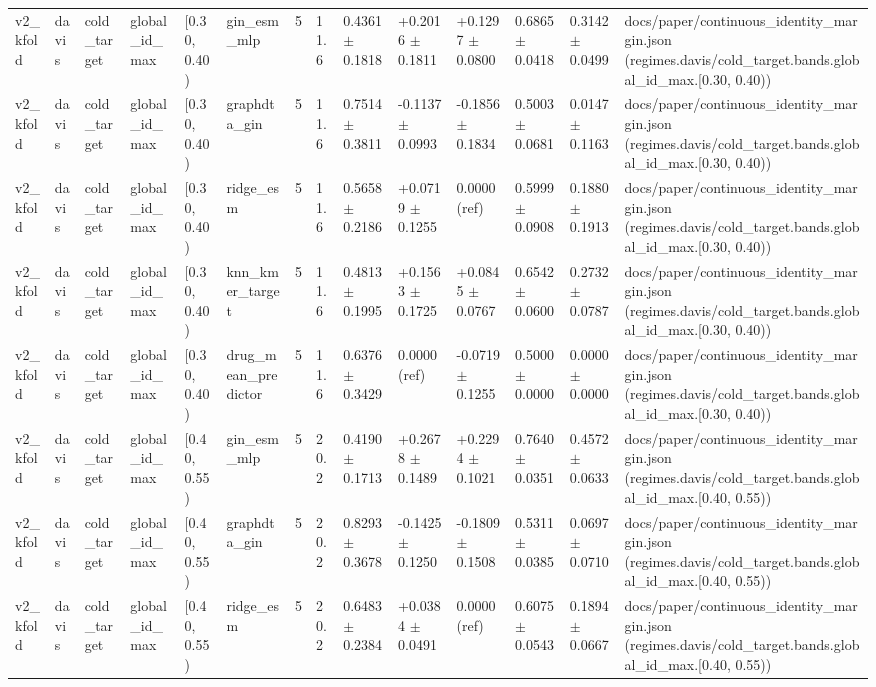\begin{table}[htbp]
\begin{tabular}{llllllllllllll}
v2\_kfold & davis & cold\_target & global\_id\_max & [0.30, 0.40) & gin\_esm\_mlp & 5 & 11.6 & 0.4361 $\pm$ 0.1818 & +0.2016 $\pm$ 0.1811 & +0.1297 $\pm$ 0.0800 & 0.6865 $\pm$ 0.0418 & 0.3142 $\pm$ 0.0499 & docs/paper/continuous\_identity\_margin.json (regimes.davis/cold\_target.bands.global\_id\_max.[0.30, 0.40)) \\
v2\_kfold & davis & cold\_target & global\_id\_max & [0.30, 0.40) & graphdta\_gin & 5 & 11.6 & 0.7514 $\pm$ 0.3811 & -0.1137 $\pm$ 0.0993 & -0.1856 $\pm$ 0.1834 & 0.5003 $\pm$ 0.0681 & 0.0147 $\pm$ 0.1163 & docs/paper/continuous\_identity\_margin.json (regimes.davis/cold\_target.bands.global\_id\_max.[0.30, 0.40)) \\
v2\_kfold & davis & cold\_target & global\_id\_max & [0.30, 0.40) & ridge\_esm & 5 & 11.6 & 0.5658 $\pm$ 0.2186 & +0.0719 $\pm$ 0.1255 & 0.0000 (ref) & 0.5999 $\pm$ 0.0908 & 0.1880 $\pm$ 0.1913 & docs/paper/continuous\_identity\_margin.json (regimes.davis/cold\_target.bands.global\_id\_max.[0.30, 0.40)) \\
v2\_kfold & davis & cold\_target & global\_id\_max & [0.30, 0.40) & knn\_kmer\_target & 5 & 11.6 & 0.4813 $\pm$ 0.1995 & +0.1563 $\pm$ 0.1725 & +0.0845 $\pm$ 0.0767 & 0.6542 $\pm$ 0.0600 & 0.2732 $\pm$ 0.0787 & docs/paper/continuous\_identity\_margin.json (regimes.davis/cold\_target.bands.global\_id\_max.[0.30, 0.40)) \\
v2\_kfold & davis & cold\_target & global\_id\_max & [0.30, 0.40) & drug\_mean\_predictor & 5 & 11.6 & 0.6376 $\pm$ 0.3429 & 0.0000 (ref) & -0.0719 $\pm$ 0.1255 & 0.5000 $\pm$ 0.0000 & 0.0000 $\pm$ 0.0000 & docs/paper/continuous\_identity\_margin.json (regimes.davis/cold\_target.bands.global\_id\_max.[0.30, 0.40)) \\
v2\_kfold & davis & cold\_target & global\_id\_max & [0.40, 0.55) & gin\_esm\_mlp & 5 & 20.2 & 0.4190 $\pm$ 0.1713 & +0.2678 $\pm$ 0.1489 & +0.2294 $\pm$ 0.1021 & 0.7640 $\pm$ 0.0351 & 0.4572 $\pm$ 0.0633 & docs/paper/continuous\_identity\_margin.json (regimes.davis/cold\_target.bands.global\_id\_max.[0.40, 0.55)) \\
v2\_kfold & davis & cold\_target & global\_id\_max & [0.40, 0.55) & graphdta\_gin & 5 & 20.2 & 0.8293 $\pm$ 0.3678 & -0.1425 $\pm$ 0.1250 & -0.1809 $\pm$ 0.1508 & 0.5311 $\pm$ 0.0385 & 0.0697 $\pm$ 0.0710 & docs/paper/continuous\_identity\_margin.json (regimes.davis/cold\_target.bands.global\_id\_max.[0.40, 0.55)) \\
v2\_kfold & davis & cold\_target & global\_id\_max & [0.40, 0.55) & ridge\_esm & 5 & 20.2 & 0.6483 $\pm$ 0.2384 & +0.0384 $\pm$ 0.0491 & 0.0000 (ref) & 0.6075 $\pm$ 0.0543 & 0.1894 $\pm$ 0.0667 & docs/paper/continuous\_identity\_margin.json (regimes.davis/cold\_target.bands.global\_id\_max.[0.40, 0.55)) \\

\end{tabular}
\end{table}
